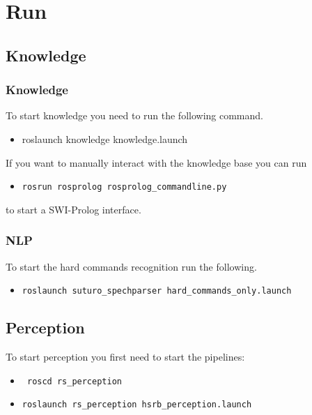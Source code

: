 \documentclass[main.tex]{subfiles}
\begin{document}
\newpage
	\section{Run}
	\subsection{Knowledge}
	\subsubsection{Knowledge}
	To start knowledge you need to run the following command.
	\begin{itemize}
\item roslaunch knowledge knowledge.launch
\end{itemize}
If you want to manually interact with the knowledge base you can run 
\begin{itemize}
\item \begin{verbatim}rosrun rosprolog rosprolog_commandline.py \end{verbatim}
\end{itemize}
to start a SWI-Prolog interface.
	
	\subsubsection{NLP}
	
	To start the hard commands recognition run the following.
	
	\begin{itemize}
		\item \begin{verbatim}roslaunch suturo_spechparser hard_commands_only.launch \end{verbatim}
	\end{itemize}
	
	\subsection{Perception}

	To start perception you first need to start the pipelines:
	\begin{itemize}
\item \begin{verbatim} roscd rs_perception \end{verbatim} 
\item \begin{verbatim}
roslaunch rs_perception hsrb_perception.launch
\end{verbatim}
\end{itemize}	
\end{document}
